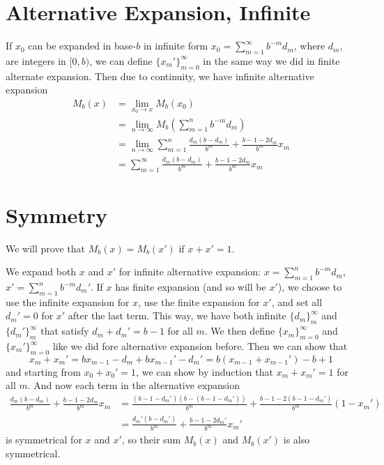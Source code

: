 \documentclass[]{article}
\begin{document}
\section{Alternative Expansion, Infinite}
If $x_0$ can be expanded in base-$b$ in infinite form $x_0=\sum_{m=1}^\infty b^{-m}d_m$, where $d_m$, are integers in $[0, b)$, we can define $\{x_m'\}_{m = 0}^\infty$ in the same way we did in finite alternate expansion. Then due to continuity, we have infinite alternative expansion
\begin{align*}
M_b(x) &= \lim_{x_0\to x} M_b(x_0) \\
&= \lim_{n\to\infty}M_b\left(\sum_{m=1}^n b^{-m}d_m\right) \\
&= \lim_{n\to\infty} \sum_{m=1}^n \frac{d_m(b-d_m)}{b^m} + \frac{b-1-2d_m}{b^m}x_m\\
& = \sum_{m=1}^\infty \frac{d_m(b-d_m)}{b^m} + \frac{b-1-2d_m}{b^m}x_m
\end{align*}

\section{Symmetry}
We will prove that $M_b(x) = M_b(x')$ if $x + x' = 1$.

We expand both $x$ and $x'$ for infinite alternative expansion: $x = \sum_{m=1}^n b^{-m}d_m$, $x' = \sum_{m=1}^n b^{-m}d_m'$. If $x$ has finite expansion (and so will be $x'$), we choose to use the infinite expansion for $x$, use the finite expansion for $x'$, and set all $d_m' = 0$ for $x'$ after the last term. This way, we have both infinite $\{d_m\}_m^\infty$ and $\{d_m'\}_m^\infty$ that satisfy $d_m + d_m' = b -1$ for all $m$. We then define $\{x_m\}_{m = 0}^\infty$ and $\{x_m'\}_{m = 0}^\infty$ like we did fore alternative expansion before. Then we can show that 
\[
x_m + x_m' = bx_{m-1} - d_m +bx_{m-1}' - d_m' = b(x_{m-1}+x_{m-1}')  - b + 1
\]
and starting from $x_{0}+x_{0}' = 1$, we can show by induction that $x_m + x_m' = 1$ for all $m$. And now each term in the alternative expansion
\begin{align*}
\frac{d_m(b-d_m)}{b^m} + \frac{b-1-2d_m}{b^m}x_m &= \frac{(b-1-d_m')(b-(b-1-d_m'))}{b^m} + \frac{b-1-2(b-1-d_m')}{b^m}(1-x_m')\\
&= \frac{d_m'(b-d_m')}{b^m} + \frac{b-1-2d_m'}{b^m}x_m'
\end{align*}
is symmetrical for $x$ and $x'$, so their sum $M_b(x)$ and $M_b(x')$ is also symmetrical.
\end{document}
